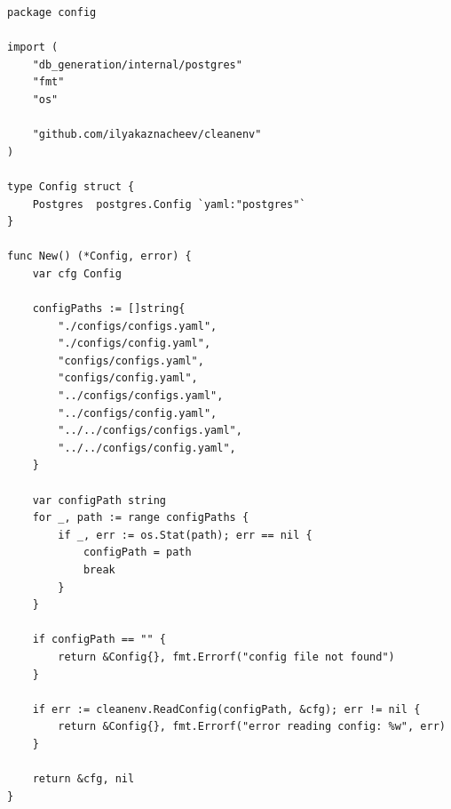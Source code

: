 \begin{lstlisting}[style=gostyle, caption={Загрузка конфигурации (internal/config/config.go)}, label={lst:goConfig}]
package config

import (
	"db_generation/internal/postgres"
	"fmt"
	"os"

	"github.com/ilyakaznacheev/cleanenv"
)

type Config struct {
	Postgres  postgres.Config `yaml:"postgres"`
}

func New() (*Config, error) {
	var cfg Config

	configPaths := []string{
		"./configs/configs.yaml",
		"./configs/config.yaml",
		"configs/configs.yaml",
		"configs/config.yaml",
		"../configs/configs.yaml",
		"../configs/config.yaml",
		"../../configs/configs.yaml",
		"../../configs/config.yaml",
	}

	var configPath string
	for _, path := range configPaths {
		if _, err := os.Stat(path); err == nil {
			configPath = path
			break
		}
	}

	if configPath == "" {
		return &Config{}, fmt.Errorf("config file not found")
	}

	if err := cleanenv.ReadConfig(configPath, &cfg); err != nil {
		return &Config{}, fmt.Errorf("error reading config: %w", err)
	}

	return &cfg, nil
}
\end{lstlisting}
\newpage

